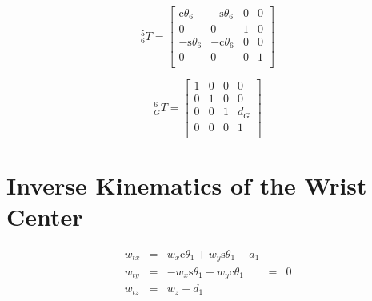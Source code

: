 \documentclass[twoside]{article}
\renewcommand{\c}{\text{c}}
\newcommand{\s}{\text{s}}
\newcommand{\T}[2]{\mbox{$_{#2}^{#1}{T}$}}
\begin{document}
\begin{minipage}{0.33\linewidth}
\begin{equation}
\T{5}{6} =
\begin{bmatrix}
  \c\theta_6 & -\s\theta_6 & 0 & 0 \\
           0 &           0 & 1 & 0 \\
 -\s\theta_6 & -\c\theta_6 & 0 & 0 \\
           0 &           0 & 0 & 1 \\
\end{bmatrix}
\end{equation}
\end{minipage}%
\begin{minipage}{0.33\linewidth}
\begin{equation}
\T{6}{G} =
\begin{bmatrix}
  1 & 0 & 0 &   0 \\
  0 & 1 & 0 &   0 \\
  0 & 0 & 1 & d_G \\
  0 & 0 & 0 &   1 \\
\end{bmatrix}
\end{equation}
\end{minipage}%
\begin{minipage}{0.33\linewidth}
\end{minipage}

\section{Inverse Kinematics of the Wrist Center}

$$
\begin{matrix}
  w_{tx} & = & w_x \c\theta_1 + w_y \s\theta_1 - a_1 & &\\
  w_{ty} & = & - w_x  \s\theta_1 + w_y \c\theta_1 & = &0\\
  w_{tz} & = & w_z - d_1&& \\
\end{matrix}
$$
\end{document}
